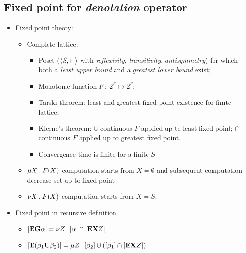 \subsection{Fixed point for \emph{denotation} operator}
\begin{itemize}
\item   Fixed point theory:

    \begin{itemize}

    \item   Complete lattice:

        \begin{itemize}

        \item   Poset ($\left<{S, \sqsubset}\right>$ with \emph{reflexivity},
                \emph{transitivity}, \emph{antisymmetry}) for which both a
                \emph{least upper bound} and a \emph{greatest lower bound}
                exist;

        \item   Monotonic function $F \::\: 2^S \mapsto 2^S$;

        \item   Tarski theorem: least and greatest fixed point
                existence for finite lattice;

        \item   Kleene's theorem: $\cup$-continuous $F$ applied up to
                least fixed point; $\cap$-continuous $F$ applied up to
                greatest fixed point.

        \item   Convergence time is finite for a finite $S$

        \end{itemize}

    \item   $\mu{X}\:.\:{F(X)}$ computation starts from $X = \emptyset$ and
            subsequent computation decrease set up to fixed point

    \item   $\nu{X}\:.\:{F(X)}$ computation starts from $X = S$.

    \end{itemize}

\item   Fixed point in recursive definition

    \begin{itemize}

    \item   $\left[{\mathcal{\mathcal{\sf \bf E}}\mathcal{\sf \bf G}\alpha}\right] =
                \nu{Z}\:.\:{\left[{\alpha}\right] \cap \left[{\mathcal{\mathcal{\sf \bf E}}\mathcal{\sf \bf X}Z}\right]}$
    \item   $\left[{\mathcal{\mathcal{\sf \bf E}}({\beta_1}\mathcal{\sf \bf U}{\beta_2})}\right] =
                \mu{Z}\:.\:{\left[{\beta_2}\right] \cup (\left[{\beta_1}\right] \cap
                          \left[{\mathcal{\mathcal{\sf \bf E}}\mathcal{\sf \bf X}Z}\right])}$


\end{itemize}
\end{itemize}
